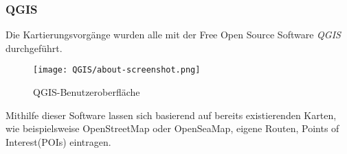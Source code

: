 \subsubsection*{QGIS}
Die Kartierungsvorgänge wurden alle mit der Free Open Source Software \emph{QGIS}\cite{qgis} durchgeführt.
\begin{figure}[ht]
    \centering
    \texttt{[image: QGIS/about-screenshot.png]}
    \caption[fig:qgisabout]{QGIS-Benutzeroberfläche}
\end{figure}
Mithilfe dieser Software lassen sich basierend auf bereits existierenden Karten, 
wie beispielsweise OpenStreetMap\cite{ostrm} oder OpenSeaMap\cite{oseamap}, eigene Routen, 
Points of Interest(POIs) eintragen.
